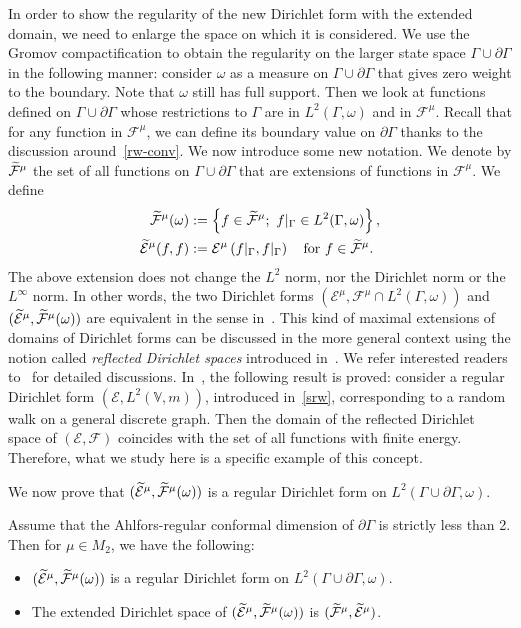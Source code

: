 \documentclass[AHL,Unicode,longabstracts,published]{cedram}
\newcommand{\ce}{\mathcal{E}}
\newcommand{\cf}{\mathcal{F}}
\newcommand{\bv}{\mathbb{V}}
\let\oldtilde\tilde
\renewcommand*{\tilde}[1]{\mathchoice{\widetilde{#1}}{\widetilde{#1}}{\oldtilde{#1}}{\oldtilde{#1}}}
\begin{document}
In order to show the regularity of the new Dirichlet form with the extended domain, we need to enlarge the space on which it is considered. We use the Gromov compactification to obtain the regularity on the larger state space $\Gamma\cup\partial\Gamma$ in the following manner: consider $\omega$ as a measure on $\Gamma\cup\partial\Gamma$ that gives zero weight to the boundary. Note that $\omega$ still has full support. Then we look at functions defined on $\Gamma\cup\partial\Gamma$ whose restrictions to $\Gamma$ are in $L^2(\Gamma,\omega)$ and in $\cf^{\mu}$. Recall that for any function in $\cf^{\mu}$, we can define its boundary value on $\partial\Gamma$ thanks to the discussion around~\eqref{rw-conv}. We now introduce some new notation. We denote by $\tilde\cf^{\mu}$ the set of all functions on $\Gamma\cup\partial\Gamma$ that are extensions of functions in $\cf^{\mu}$. We define
\begin{align*}
\tilde\cf^{\mu}(\omega)&:=
\left\{f\in\tilde\cf^{\mu} ;\ f|_{\Gamma}\in L^2(\Gamma,\omega)\right\},\\
\tilde\ce^{\mu}(f,f)&:=\ce^{\mu}\left(f|_{\Gamma},f|_{\Gamma}\right)\quad \text{for}\ f\in\tilde\cf^{\mu}.
\end{align*}
The above extension does not change the $L^2$ norm, nor the Dirichlet norm or the $L^{\infty}$ norm. In other words, the two Dirichlet forms $(\ce^{\mu}, \cf^{\mu}\cap L^2(\Gamma,\omega))$ and $(\tilde\ce^{\mu}, \tilde\cf^{\mu}(\omega))$ are equivalent in the sense in~\cite[Appendix~A.4, p.~422]{FOT}. This kind of maximal extensions of domains of Dirichlet forms can be discussed in the more general context using the notion called \emph{reflected Dirichlet spaces} introduced in~\cite{Ch1}. We refer interested readers to~\cite[Chapter~6]{CF} for detailed discussions. In~\cite[Section~6.5]{CF}, the following result is proved: consider a regular Dirichlet form $(\ce,L^2(\bv,m))$, introduced in~\eqref{srw}, corresponding to a random walk on a general discrete graph. Then the domain of the reflected Dirichlet space of $(\ce,\cf)$ coincides with the set of all functions with finite energy. Therefore, what we study here is a specific example of this concept.


We now prove that $(\tilde\ce^{\mu}, \tilde\cf^{\mu}(\omega))$ is a regular Dirichlet form on $L^2(\Gamma\cup\partial\Gamma,\omega)$.



\begin{theo}\label{w}
Assume that the Ahlfors-regular conformal dimension of $\partial\Gamma$ is strictly less than 2. Then for $\mu\in M_2$, we have the following:
\begin{itemize}
\item $(\tilde\ce^{\mu}, \tilde\cf^{\mu}(\omega))$ is a regular Dirichlet form on $L^2(\Gamma\cup\partial\Gamma,\omega)$.
\item The extended Dirichlet space of $(\tilde\ce^{\mu},
\tilde\cf^{\mu}(\omega))$ is $(\tilde{\cf}^{\mu},\tilde{\ce}^{\mu})$.
\end{itemize}
\end{theo}
\end{document}
